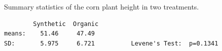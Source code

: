 \documentclass[10pt,openany]{book}\usepackage[]{graphicx}\usepackage[]{color}
\begin{document}
\vspace*{-4pt}
\begin{table}[htbp]
  \caption{Summary statistics of the corn plant height in two treatments.}
  \label{tab:CornFert}
\vspace*{-5pt}
  \begin{center}
    \begin{minipage}{4.5in}
      \begin{Verbatim}
        Synthetic  Organic
means:    51.46     47.49
SD:       5.975     6.721          Levene's Test:  p=0.1341
      \end{Verbatim}
    \end{minipage}
  \end{center}
\end{table}
\vspace*{-18pt}
\end{document}
